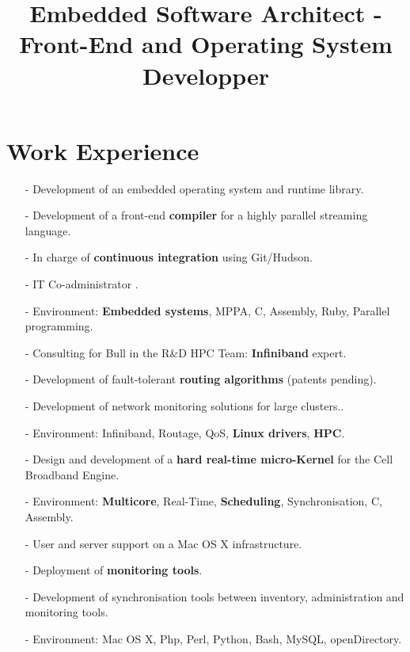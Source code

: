 \documentclass[10pt,a4paper]{moderncv}
\title{Embedded Software Architect - Front-End and Operating System Developper}
\begin{document}
\maketitle
\section{Work Experience}
{
\begin{itemize}
\item[-]{Development of an embedded operating system and runtime library.}
\item[-]{Development of a front-end \textbf{compiler} for a highly parallel streaming language.}
\item[-]{In charge of \textbf{continuous integration} using Git/Hudson.}
\item[-]{IT Co-administrator .}
\item[-]{Environment: \textbf{Embedded systems}, MPPA, C, Assembly, Ruby, Parallel programming.}
\end{itemize}
}

{
\begin{itemize}
\item[-]{Consulting for Bull in the R\&D HPC Team: \textbf{Infiniband} expert.}
\item[-]{Development of fault-tolerant \textbf{routing algorithms} (patents pending).}
\item[-]{Development of network monitoring solutions for large clusters..}
\item[-]{Environment: Infiniband, Routage, QoS, \textbf{Linux drivers}, \textbf{HPC}.}
\end{itemize}
}

{
\begin{itemize}
\item[-]{Design and development of a \textbf{hard real-time micro-Kernel} for the Cell Broadband Engine.}
\item[-]{Environment: \textbf{Multicore}, Real-Time, \textbf{Scheduling}, Synchronisation, C, Assembly.}
\end{itemize}
}

{
\begin{itemize}
\item[-]{User and server support on a Mac OS X infrastructure.}
\item[-]{Deployment of \textbf{monitoring tools}.}
\item[-]{Development of synchronisation tools between inventory, administration and monitoring tools.}
\item[-]{Environment: Mac OS X, Php, Perl, Python, Bash, MySQL, openDirectory.}
\end{itemize}
}
\end{document}
